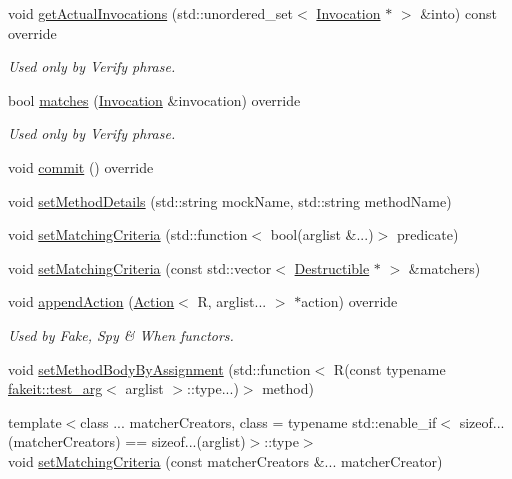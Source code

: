 \begin{DoxyCompactItemize}
void \mbox{\hyperlink{classfakeit_1_1MethodMockingContext_ad6803405abfd419799882f837d6f56b6}{get\+Actual\+Invocations}} (std\+::unordered\+\_\+set$<$ \mbox{\hyperlink{structfakeit_1_1Invocation}{Invocation}} $\ast$ $>$ \&into) const override
\begin{DoxyCompactList}\small\item\em Used only by Verify phrase. \end{DoxyCompactList}\item 
bool \mbox{\hyperlink{classfakeit_1_1MethodMockingContext_a240fe9e15cffcebd52f5b0c9ccf87654}{matches}} (\mbox{\hyperlink{structfakeit_1_1Invocation}{Invocation}} \&invocation) override
\begin{DoxyCompactList}\small\item\em Used only by Verify phrase. \end{DoxyCompactList}\item 
void \mbox{\hyperlink{classfakeit_1_1MethodMockingContext_a68a56b3fbd0a2b654a1c72de66e68a71}{commit}} () override
\item 
void \mbox{\hyperlink{classfakeit_1_1MethodMockingContext_a108167e6800e17c71ed5bbed5fcd955a}{set\+Method\+Details}} (std\+::string mock\+Name, std\+::string method\+Name)
\item 
void \mbox{\hyperlink{classfakeit_1_1MethodMockingContext_a43555a14b32453588eb3990a7c6b9a09}{set\+Matching\+Criteria}} (std\+::function$<$ bool(arglist \&...)$>$ predicate)
\item 
void \mbox{\hyperlink{classfakeit_1_1MethodMockingContext_affc5ac50fc419a5f8b5adff8d5d02941}{set\+Matching\+Criteria}} (const std\+::vector$<$ \mbox{\hyperlink{classfakeit_1_1Destructible}{Destructible}} $\ast$ $>$ \&matchers)
\item 
void \mbox{\hyperlink{classfakeit_1_1MethodMockingContext_ad413d04564c89fe134dfb7bae1a1f2a1}{append\+Action}} (\mbox{\hyperlink{structfakeit_1_1Action}{Action}}$<$ R, arglist... $>$ $\ast$action) override
\begin{DoxyCompactList}\small\item\em Used by Fake, Spy \& When functors. \end{DoxyCompactList}\item 
void \mbox{\hyperlink{classfakeit_1_1MethodMockingContext_ade0a1e36946f68957ee3717147122c4d}{set\+Method\+Body\+By\+Assignment}} (std\+::function$<$ R(const typename \mbox{\hyperlink{structfakeit_1_1test__arg}{fakeit\+::test\+\_\+arg}}$<$ arglist $>$\+::type...)$>$ method)
\item 
{\footnotesize template$<$class ... matcher\+Creators, class  = typename std\+::enable\+\_\+if$<$                sizeof...(matcher\+Creators) == sizeof...(arglist)$>$\+::type$>$ }\\void \mbox{\hyperlink{classfakeit_1_1MethodMockingContext_ab6bf85e9f9f5e5eeb2766ec487a42e20}{set\+Matching\+Criteria}} (const matcher\+Creators \&... matcher\+Creator)

\end{DoxyCompactItemize}
